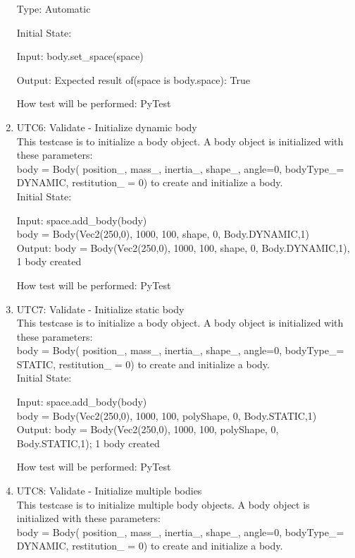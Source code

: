\documentclass[12pt, titlepage]{article}
\begin{document}
\begin{enumerate}
Type: Automatic

Initial State: 

Input: body.set\_space(space)

Output: Expected result of(space is body.space): True

How test will be performed: PyTest\\

\item{UTC6}{: Validate - Initialize dynamic body\\}
This testcase is to initialize a body object.
A body object is initialized with these parameters:\\ 
body = Body( position\_, mass\_, inertia\_, shape\_, angle=0, bodyType\_= DYNAMIC, restitution\_ = 0) to create and initialize a body.\\

Initial State: 

Input: space.add\_body(body)\\
body = Body(Vec2(250,0), 1000, 100, shape, 0, Body.DYNAMIC,1)\\

Output: body = Body(Vec2(250,0), 1000, 100, shape, 0, Body.DYNAMIC,1), 1 body created

How test will be performed: PyTest\\

\item{UTC7}{: Validate - Initialize static body\\}
This testcase is to initialize a body object.
A body object is initialized with these parameters:\\ 
body = Body( position\_, mass\_, inertia\_, shape\_, angle=0, bodyType\_= STATIC, restitution\_ = 0) to create and initialize a body.\\

Initial State: 

Input: space.add\_body(body)\\
body = Body(Vec2(250,0), 1000, 100, polyShape, 0, Body.STATIC,1)\\

Output: body = Body(Vec2(250,0), 1000, 100, polyShape, 0, Body.STATIC,1); 1 body created

How test will be performed: PyTest\\

\item{UTC8}{: Validate - Initialize multiple bodies\\}
This testcase is to initialize multiple body objects.
A body object is initialized with these parameters:\\ 
body = Body( position\_, mass\_, inertia\_, shape\_, angle=0, bodyType\_= DYNAMIC, restitution\_ = 0) to create and initialize a body.\\


\end{enumerate}
\end{document}
